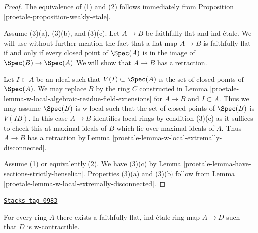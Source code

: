 \begin{proof}

The equivalence of (1) and (2) follows immediately from
Proposition \ref{proetale-proposition-weakly-etale}.

\medskip\noindent
Assume (3)(a), (3)(b), and (3)(c). Let $A \to B$ be faithfully flat
and ind-\'etale. We will use without further mention the fact that a flat map
$A \to B$ is faithfully flat if and only if every closed point
of $\Spec(A)$ is in the image of $\Spec(B) \to \Spec(A)$
We will show that $A \to B$ has a retraction.

\medskip\noindent
Let $I \subset A$ be an ideal such that $V(I) \subset \Spec(A)$ is
the set of closed points of $\Spec(A)$.
We may replace $B$ by the ring $C$ constructed in
Lemma \ref{proetale-lemma-w-local-algebraic-residue-field-extensions}
for $A \to B$ and $I \subset A$.
Thus we may assume $\Spec(B)$ is w-local such that the set of
closed points of $\Spec(B)$ is $V(IB)$. In this case $A \to B$
identifies local rings by condition (3)(c) as it suffices to check
this at maximal ideals of $B$ which lie over maximal ideals of $A$.
Thus $A \to B$ has a retraction by
Lemma \ref{proetale-lemma-w-local-extremally-disconnected}.

\medskip\noindent
Assume (1) or equivalently (2). We have (3)(c) by
Lemma \ref{proetale-lemma-have-sections-strictly-henselian}.
Properties (3)(a) and (3)(b) follow from
Lemma \ref{proetale-lemma-w-local-extremally-disconnected}.
\end{proof}

\begin{proposition}
\label{proetale-proposition-find-w-contractible}
\href{https://stacks.math.columbia.edu/tag/0983}{\texttt{Stacks tag 0983}}

For every ring $A$ there exists a faithfully flat, ind-\'etale ring
map $A \to D$ such that $D$ is w-contractible.
\end{proposition}

